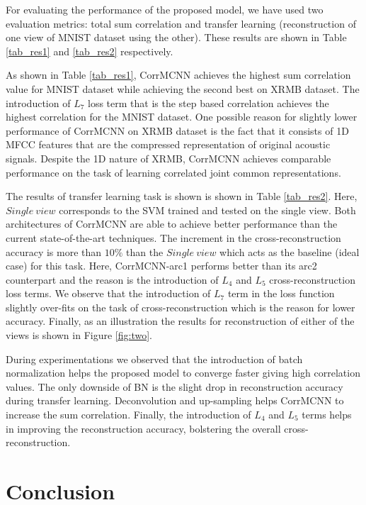 \documentclass[10pt, a4paper, conference, compsocconf]{IEEEtran}
\begin{document}
For evaluating the performance of the proposed model, we have used two evaluation metrics: total sum correlation and transfer learning (reconstruction of one view of MNIST dataset using the other). These results are shown in Table \ref{tab_res1} and \ref{tab_res2} respectively.

As shown in Table \ref{tab_res1}, CorrMCNN achieves the highest sum correlation value for MNIST dataset while achieving the second best on XRMB dataset. The introduction of $L_7$ loss term that is the step based correlation achieves the highest correlation for the MNIST dataset. One possible reason for slightly lower performance of CorrMCNN on XRMB dataset is the fact that it consists of 1D MFCC features that are the compressed representation of original acoustic signals. Despite the 1D nature of XRMB, CorrMCNN achieves comparable performance on the task of learning correlated joint common representations.

The results of transfer learning task is shown is shown in Table \ref{tab_res2}. Here, $Single\ view$ corresponds to the SVM trained and tested on the single view. Both architectures of CorrMCNN are able to achieve better performance than the current state-of-the-art techniques. The increment in the cross-reconstruction accuracy is more than $10\%$ than the $Single\ view$ which acts as the baseline (ideal case) for this task. Here, CorrMCNN-arc1 performs better than its arc2 counterpart and the reason is the introduction of $L_4$ and $L_5$ cross-reconstruction loss terms. We observe that the introduction of $L_7$ term in the loss function slightly over-fits on the task of cross-reconstruction which is the reason for lower accuracy. Finally, as an illustration the results for reconstruction of either of the views is shown in Figure \ref{fig:two}. 

During experimentations we observed that the introduction of batch normalization helps the proposed model to converge faster giving high correlation values. The only downside of BN is the slight drop in reconstruction accuracy during transfer learning. Deconvolution and up-sampling helps CorrMCNN to increase the sum correlation. Finally, the introduction of $L_4$ and $L_5$ terms helps in improving the reconstruction accuracy, bolstering the overall cross-reconstruction.

\section{Conclusion}
\label{sec_con}
\end{document}
